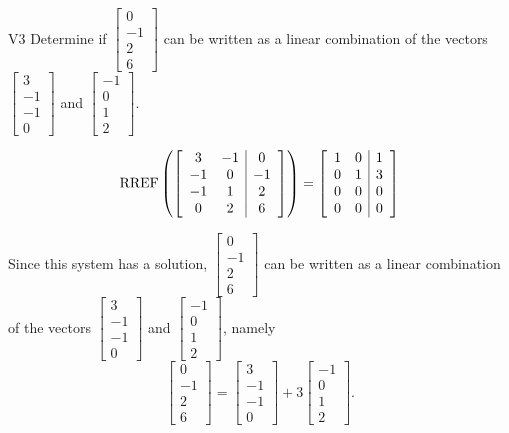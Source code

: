 \begin{problem}{V3}
Determine if \(\begin{bmatrix}0 \\ -1 \\ 2 \\ 6 \end{bmatrix}\) can be written as a linear combination of the vectors \(\begin{bmatrix} 3 \\ -1 \\ -1 \\ 0 \end{bmatrix}\) and \(\begin{bmatrix} -1 \\ 0 \\ 1 \\ 2 \end{bmatrix}\).
\end{problem}
\begin{solution}
\[\operatorname{RREF}\left(\left[\begin{array}{cc|c} 3 & -1 & 0 \\ -1 & 0 & -1 \\ -1 & 1 & 2 \\ 0 & 2 & 6\end{array} \right] \right)= \left[ \begin{array}{cc|c} 1 & 0 & 1 \\ 0 & 1 & 3 \\ 0 & 0 & 0 \\ 0 & 0 & 0 \end{array} \right]\]

Since this system has a solution, \(\begin{bmatrix}0 \\ -1 \\ 2 \\ 6 \end{bmatrix}\) can be written as a linear combination of the vectors \(\begin{bmatrix} 3 \\ -1 \\ -1 \\ 0 \end{bmatrix}\) and \(\begin{bmatrix} -1 \\ 0 \\ 1 \\ 2 \end{bmatrix}\), namely
\[\begin{bmatrix}0 \\ -1 \\ 2 \\ 6 \end{bmatrix}=\begin{bmatrix} 3 \\ -1 \\ -1 \\ 0 \end{bmatrix}+3\begin{bmatrix} -1 \\ 0 \\ 1 \\ 2 \end{bmatrix}.\]
\end{solution}

